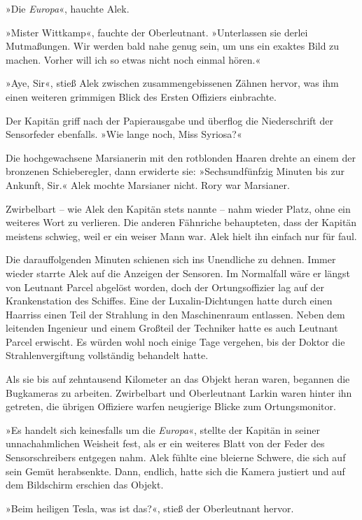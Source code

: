 »Die \textit{Europa}«, hauchte Alek.

»Mister Wittkamp«, fauchte der Oberleutnant. »Unterlassen sie
derlei Mutmaßungen. Wir werden bald nahe genug sein, um uns ein
exaktes Bild zu machen. Vorher will ich so etwas nicht noch einmal
hören.«

»Aye, Sir«, stieß Alek zwischen zusammengebissenen Zähnen hervor,
was ihm einen weiteren grimmigen Blick des Ersten Offiziers
einbrachte.

Der Kapitän griff nach der Papierausgabe und überflog die
Niederschrift der Sensorfeder ebenfalls. »Wie lange noch, Miss
Syriosa?«

Die hochgewachsene Marsianerin mit den rotblonden Haaren drehte an
einem der bronzenen Schieberegler, dann erwiderte sie:
»Sechsundfünfzig Minuten bis zur Ankunft, Sir.« Alek mochte
Marsianer nicht. Rory war Marsianer.

Zwirbelbart – wie Alek den Kapitän stets nannte – nahm wieder
Platz, ohne ein weiteres Wort zu verlieren. Die anderen Fähnriche
behaupteten, dass der Kapitän meistens schwieg, weil er ein weiser
Mann war. Alek hielt ihn einfach nur für faul.

Die darauffolgenden Minuten schienen sich ins Unendliche zu dehnen.
Immer wieder starrte Alek auf die Anzeigen der Sensoren. Im
Normalfall wäre er längst von Leutnant Parcel abgelöst worden, doch
der Ortungsoffizier lag auf der Krankenstation des Schiffes. Eine
der Luxalin-Dichtungen hatte durch einen Haarriss einen Teil der
Strahlung in den Maschinenraum entlassen. Neben dem leitenden
Ingenieur und einem Großteil der Techniker hatte es auch Leutnant
Parcel erwischt. Es würden wohl noch einige Tage vergehen, bis der
Doktor die Strahlenvergiftung vollständig behandelt hatte.

Als sie bis auf zehntausend Kilometer an das Objekt heran waren,
begannen die Bugkameras zu arbeiten. Zwirbelbart und Oberleutnant
Larkin waren hinter ihn getreten, die übrigen Offiziere warfen
neugierige Blicke zum Ortungsmonitor.

»Es handelt sich keinesfalls um die \textit{Europa}«, stellte der Kapitän in
seiner unnachahmlichen Weisheit fest, als er ein weiteres Blatt von
der Feder des Sensorschreibers entgegen nahm. Alek fühlte eine
bleierne Schwere, die sich auf sein Gemüt herabsenkte. Dann,
endlich, hatte sich die Kamera justiert und auf dem Bildschirm
erschien das Objekt.

»Beim heiligen Tesla, was ist das?«, stieß der Oberleutnant
hervor.

